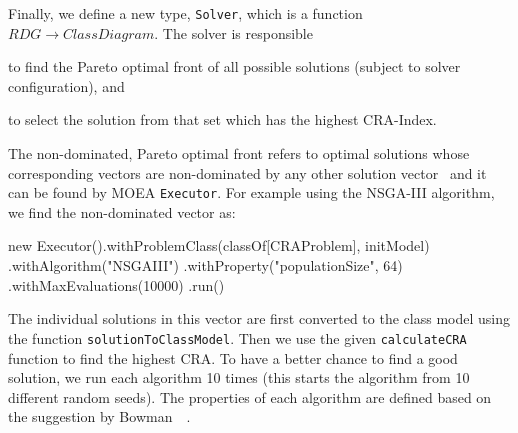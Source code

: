 Finally, we define a new type, \texttt{Solver}, which is a function $RDG \rightarrow ClassDiagram$.
The solver is responsible
%
\begin{inparaenum}[(1)]
  \item to find the Pareto optimal front of all possible solutions (subject to solver configuration), and
  \item to select the solution from that set which has the highest CRA-Index.
\end{inparaenum}
The non-dominated, Pareto optimal front refers to optimal solutions whose corresponding vectors are non-dominated by any other solution vector~\cite{bowman2010solving} and it can be found by MOEA \texttt{Executor}.
For example using the NSGA-III algorithm, we find the non-dominated vector as:
%
\begin{scalacode}
new Executor().withProblemClass(classOf[CRAProblem], initModel)
              .withAlgorithm("NSGAIII")
              .withProperty("populationSize", 64)
              .withMaxEvaluations(10000)
              .run()
\end{scalacode}
%
The individual solutions in this vector are first converted to the class model using the function \texttt{solutionToClassModel}. 
Then we use the given \texttt{calculateCRA} function to find the highest CRA.
To have a better chance to find a good solution, we run each algorithm 10 times (this starts the algorithm from 10 different random seeds).
The properties of each algorithm are defined based on the suggestion by Bowman~\Etal~\cite{bowman2010solving}.

